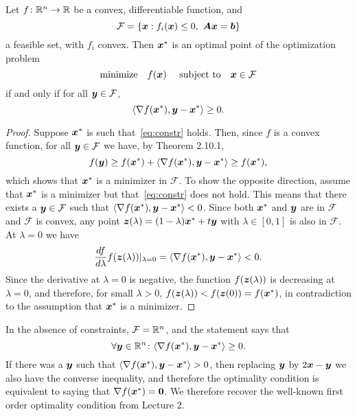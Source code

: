 \begin{theorem}
 Let $f\colon \mathbb{R}^n\to \mathbb{R}$ be a convex, differentiable function, and 
 \begin{equation*}
  \mathcal{F}=\{\vct{x} \mid f_i(\vct{x})\leq 0, \ \mtx{A}\vct{x}=\vct{b}\}
 \end{equation*}
a feasible set, with $f_i$ convex. Then $\bm{x}^*$ is an optimal point of the optimization problem
\begin{equation*}
 \text{minimize}\quad f(\bm{x}) \ \quad\text{subject to}\quad \bm{x}\in \mathcal{F}
\end{equation*}
if and only if for all $\bm{y}\in \mathcal{F}$, 
\begin{equation}\label{eq:opt}
 \langle {\nabla f(\bm{x}^*)}, {\bm{y}-\bm{x}^*} \rangle\geq 0.
\end{equation}
\end{theorem}

\begin{proof}
 Suppose $\bm{x}^*$ is such that~\eqref{eq:constr} holds. Then, since $f$ is a convex function,
 for all $\bm{y}\in \mathcal{F}$ we have, by Theorem 2.10.1,
 \begin{equation*}
  f(\bm{y})\geq f(\bm{x}^*)+\langle {\nabla f(\bm{x}^*)}, {\bm{y}-\bm{x}^*} \rangle \geq f(\bm{x}^*),
 \end{equation*}
which shows that $\bm{x}^*$ is a minimizer in $\mathcal{F}$. To show the opposite direction, assume that $\bm{x}^*$ is a minimizer but that~\eqref{eq:constr} does not hold. This means that there exists a $\bm{y}\in \mathcal{F}$ such that $\langle {\nabla f(\bm{x}^*)}, {\bm{y}-\bm{x}^*} \rangle<0$. Since both $\bm{x}^*$ and $\bm{y}$ are in $\mathcal{F}$ and $\mathcal{F}$ is convex, any point $\bm{z}(\lambda)=(1-\lambda)\bm{x}^*+t\bm{y}$ with $\lambda\in [0,1]$ is also in $\mathcal{F}$. At $\lambda=0$ we have
\begin{equation*}
 \frac{df}{d\lambda}f(\bm{z}(\lambda))|_{\lambda=0} = \langle {\nabla f(\bm{x}^*)}, {\bm{y}-\bm{x}^*} \rangle<0.
\end{equation*}
Since the derivative at $\lambda=0$ is negative, the function $f(\bm{z}(\lambda))$ is decreasing at $\lambda=0$, and therefore, for small $\lambda>0$, $f(\bm{z}(\lambda))<f(\bm{z}(0))=f(\bm{x}^*)$, in contradiction to the assumption that $\bm{x}^*$ is a minimizer.
\end{proof}

\begin{example}
 In the absence of constraints, $\mathcal{F}=\mathbb{R}^n$, and the statement says that
 \begin{equation*}
  \forall \bm{y}\in \mathbb{R}^n\colon \langle {\nabla f(\bm{x}^*)}, {\bm{y}-\bm{x}^*} \rangle\geq 0.
 \end{equation*}
If there was a $\bm{y}$ such that $\langle {\nabla f(\bm{x}^*)}, {\bm{y}-\bm{x}^*} \rangle>0$, then replacing $\bm{y}$ by $2\bm{x}-\bm{y}$ we also have the converse inequality, and therefore the optimality condition is equivalent to saying that $\nabla f(\bm{x}^*)=\bm{0}$. We therefore recover the well-known first order optimality condition from Lecture 2. 
\end{example}

